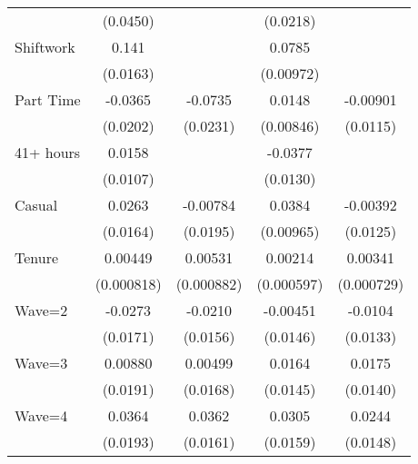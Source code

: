 {\begin{tabular}{l*{4}{c}}
                    &    (0.0450)         &                     &    (0.0218)         &                     \\
[1em]
Shiftwork           &       0.141\sym{***}&                     &      0.0785\sym{***}&                     \\
                    &    (0.0163)         &                     &   (0.00972)         &                     \\
[1em]
Part Time           &     -0.0365         &     -0.0735\sym{**} &      0.0148         &    -0.00901         \\
                    &    (0.0202)         &    (0.0231)         &   (0.00846)         &    (0.0115)         \\
[1em]
41+ hours           &      0.0158         &                     &     -0.0377\sym{**} &                     \\
                    &    (0.0107)         &                     &    (0.0130)         &                     \\
[1em]
Casual              &      0.0263         &    -0.00784         &      0.0384\sym{***}&    -0.00392         \\
                    &    (0.0164)         &    (0.0195)         &   (0.00965)         &    (0.0125)         \\
[1em]
Tenure              &     0.00449\sym{***}&     0.00531\sym{***}&     0.00214\sym{***}&     0.00341\sym{***}\\
                    &  (0.000818)         &  (0.000882)         &  (0.000597)         &  (0.000729)         \\
[1em]
Wave=2              &     -0.0273         &     -0.0210         &    -0.00451         &     -0.0104         \\
                    &    (0.0171)         &    (0.0156)         &    (0.0146)         &    (0.0133)         \\
[1em]
Wave=3              &     0.00880         &     0.00499         &      0.0164         &      0.0175         \\
                    &    (0.0191)         &    (0.0168)         &    (0.0145)         &    (0.0140)         \\
[1em]
Wave=4              &      0.0364         &      0.0362\sym{*}  &      0.0305         &      0.0244         \\
                    &    (0.0193)         &    (0.0161)         &    (0.0159)         &    (0.0148)         \\

\end{tabular}}
